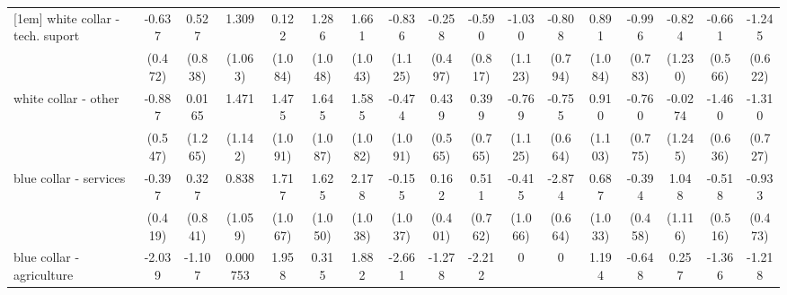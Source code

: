 {\begin{tabular}{l*{16}{c}}
[1em]
white collar - tech. suport&      -0.637         &       0.527         &       1.309         &       0.122         &       1.286         &       1.661         &      -0.836         &      -0.258         &      -0.590         &      -1.030         &      -0.808         &       0.891         &      -0.996         &      -0.824         &      -0.661         &      -1.245\sym{*}  \\
                    &     (0.472)         &     (0.838)         &     (1.063)         &     (1.084)         &     (1.048)         &     (1.043)         &     (1.125)         &     (0.497)         &     (0.817)         &     (1.123)         &     (0.794)         &     (1.084)         &     (0.783)         &     (1.230)         &     (0.566)         &     (0.622)         \\
[1em]
white collar - other&      -0.887         &      0.0165         &       1.471         &       1.475         &       1.645         &       1.585         &      -0.474         &       0.439         &       0.399         &      -0.769         &      -0.755         &       0.910         &      -0.760         &     -0.0274         &      -1.460\sym{*}  &      -1.310         \\
                    &     (0.547)         &     (1.265)         &     (1.142)         &     (1.091)         &     (1.087)         &     (1.082)         &     (1.091)         &     (0.565)         &     (0.765)         &     (1.125)         &     (0.664)         &     (1.103)         &     (0.775)         &     (1.245)         &     (0.636)         &     (0.727)         \\
[1em]
blue collar - services&      -0.397         &       0.327         &       0.838         &       1.717         &       1.625         &       2.178\sym{*}  &      -0.155         &       0.162         &       0.511         &      -0.415         &      -2.874\sym{***}&       0.687         &      -0.394         &       1.048         &      -0.518         &      -0.933\sym{*}  \\
                    &     (0.419)         &     (0.841)         &     (1.059)         &     (1.067)         &     (1.050)         &     (1.038)         &     (1.037)         &     (0.401)         &     (0.762)         &     (1.066)         &     (0.664)         &     (1.033)         &     (0.458)         &     (1.116)         &     (0.516)         &     (0.473)         \\
[1em]
blue collar - agriculture&      -2.039         &      -1.107         &    0.000753         &       1.958         &       0.315         &       1.882         &      -2.661         &      -1.278         &      -2.212         &           0         &           0         &       1.194         &      -0.648         &       0.257         &      -1.366         &      -1.218         \\

\end{tabular}}
